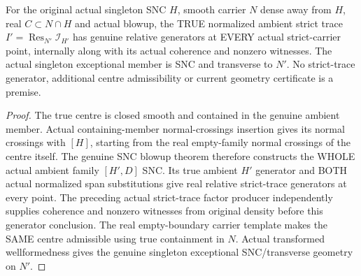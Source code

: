 \begin{lemma}
\label{hir:sharp-actual-first-ambient-strict-trace-relative-generators}
\leanok
For the original actual singleton SNC $H$, smooth carrier $N$ dense away
from $H$, real $C\subset N\cap H$ and actual blowup, the TRUE normalized
ambient strict trace $I'=\operatorname{Res}_{N'}\mathcal I_{H'}$ has
genuine relative generators at EVERY actual strict-carrier point,
internally along with its actual coherence and nonzero witnesses.
The actual singleton exceptional member is SNC and transverse to $N'$.
No strict-trace generator, additional centre admissibility or current
geometry certificate is a premise.
\end{lemma}
\begin{proof}
The true centre is closed smooth and contained in the genuine ambient
member. Actual containing-member normal-crossings insertion gives its
normal crossings with $[H]$, starting from the real empty-family normal
crossings of the centre itself. The genuine SNC blowup theorem therefore
constructs the WHOLE actual ambient family $[H',D]$ SNC. Its true ambient
$H'$ generator and BOTH actual normalized span substitutions give real
relative strict-trace generators at every point. The preceding actual
strict-trace factor producer independently supplies coherence and nonzero
witnesses from original density before this generator conclusion. The
real empty-boundary carrier template makes the SAME centre admissible
using true containment in $N$. Actual transformed wellformedness gives
the genuine singleton exceptional SNC/transverse geometry on $N'$.
\end{proof}

